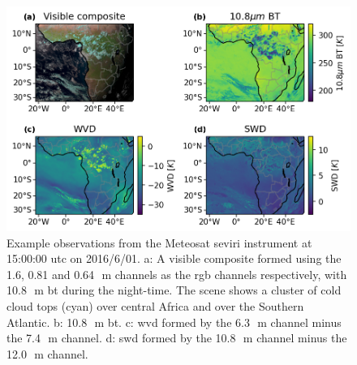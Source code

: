 \begin{figure}[tp]
    \includegraphics[width=\textwidth]{figures/ch3_01.png}
    \caption[
    Example observations from the Meteosat \acrshort{seviri} instrument at 15:00:00 \acrshort{utc} on 2016/6/01
    ]{
    Example observations from the Meteosat \acrshort{seviri} instrument at 15:00:00 \acrshort{utc} on 2016/6/01. a: A visible composite formed using the 1.6, 0.81 and 0.64\,\unit{\mu m} channels as the \acrshort{rgb} channels respectively, with 10.8\,\unit{\mu m} \acrshort{bt} during the night-time. The scene shows a cluster of cold cloud tops (cyan) over central Africa and over the Southern Atlantic. b: 10.8\,\unit{\mu m} \acrshort{bt}. c: \acrshort{wvd} formed by the 6.3\,\unit{\mu m} channel minus the 7.4\,\unit{\mu m} channel. d: \acrshort{swd} formed by the 10.8\,\unit{\mu m} channel minus the 12.0\,\unit{\mu m} channel.
    }
    \label{fig:seviri_obs_example}
\end{figure}


